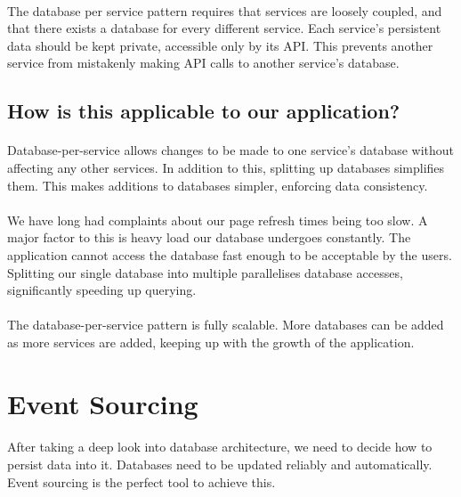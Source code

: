 \documentclass{turabian-researchpaper}
\begin{document}
\paragraph{}
The database per service pattern requires that services are loosely coupled, and that there exists a database for every different service. Each service’s persistent data should be kept private, accessible only by its API. This prevents another service from mistakenly making API calls to another service’s database.\cite{microservices.io}
\par
\subsection{How is this applicable to our application?}
\paragraph{}
Database-per-service allows changes to be made to one service’s database without affecting any other services. In addition to this, splitting up databases simplifies them. This makes additions to databases simpler, enforcing data consistency.\cite{microservices.io}
\par
\paragraph{}
We have long had complaints about our page refresh times being too slow. A major factor to this is heavy load our database undergoes constantly. The application cannot access the database fast enough to be acceptable by the users. Splitting our single database into multiple parallelises database accesses, significantly speeding up querying.
\paragraph{}
The database-per-service pattern is fully scalable. More databases can be added as more services are added, keeping up with the growth of the application. 
\par
\endsubsection
\endsection

\section{Event Sourcing}
\paragraph{}
After taking a deep look into database architecture, we need to decide how to persist data into it. Databases need to be updated reliably and automatically. Event sourcing is the perfect tool to achieve this.\cite{microservices.io}
\par
\end{document}
